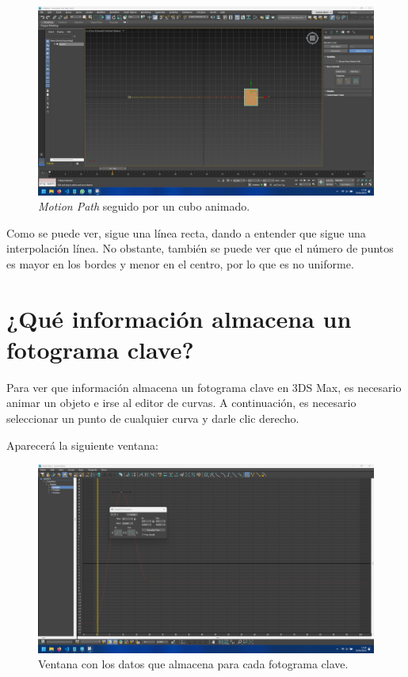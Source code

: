 \documentclass[draft]{article}
\begin{document}
\begin{figure}[H]
    \centering
    \includegraphics[width=\textwidth]{imagenes/3-1.png}
    \caption{\textit{Motion Path} seguido por un cubo animado.}
\end{figure}

Como se puede ver, sigue una línea recta, dando a entender que sigue una interpolación línea. No obstante, también se puede ver que el número de puntos es mayor en los bordes y menor en el centro, por lo que es no uniforme. 


\section{¿Qué información almacena un fotograma clave?}

Para ver que información almacena un fotograma clave en 3DS Max, es necesario animar un objeto e irse al editor de curvas. A continuación, es necesario seleccionar un punto de cualquier curva y darle clic derecho.

\bigskip

Aparecerá la siguiente ventana:

\begin{figure}[H]
    \centering
    \includegraphics[width=\textwidth]{imagenes/4-1.png}
    \caption{Ventana con los datos que almacena para cada fotograma clave.}
\end{figure}
\end{document}
